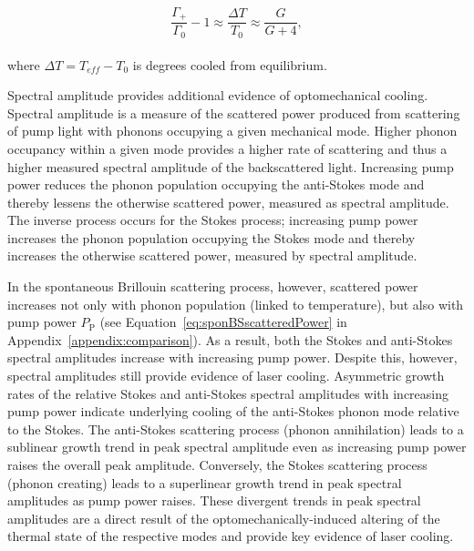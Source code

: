 \begin{equation}
  \frac{\Gamma_{+}}{\Gamma_{0}} - 1 \approx \frac{\Delta T}{T_{0}} \approx \frac{G}{G + 4},
  \label{eq:Cooliong:two methods of getting temperature}
\end{equation}
\\
where \(\Delta T = T_{eff} - T_{0}\) is degrees cooled from equilibrium.

Spectral amplitude provides additional evidence of optomechanical cooling. Spectral amplitude is a measure of the scattered power produced from scattering of pump light with phonons occupying a given mechanical mode. Higher phonon occupancy within a given mode provides a higher rate of scattering and thus a higher measured spectral amplitude of the backscattered light. Increasing pump power reduces the phonon population occupying the anti-Stokes mode and thereby lessens the otherwise scattered power, measured as spectral amplitude. The inverse process occurs for the Stokes process; increasing pump power increases the phonon population occupying the Stokes mode and thereby increases the otherwise scattered power, measured by spectral amplitude.

In the spontaneous Brillouin scattering process, however, scattered power increases not only with phonon population (linked to temperature), but also with pump power \(P_{\mathrm{P}}\) (see Equation~\ref{eq:sponBSscatteredPower} in Appendix~\ref{appendix:comparison}). As a result, both the Stokes and anti-Stokes spectral amplitudes increase with increasing pump power. Despite this, however, spectral amplitudes still provide evidence of laser cooling. Asymmetric growth rates of the relative Stokes and anti-Stokes spectral amplitudes with increasing pump power indicate underlying cooling of the anti-Stokes phonon mode relative to the Stokes. The anti-Stokes scattering process (phonon annihilation) leads to a sublinear growth trend in peak spectral amplitude even as increasing pump power raises the overall peak amplitude. Conversely, the Stokes scattering process (phonon creating) leads to a superlinear growth trend in peak spectral amplitudes as pump power raises. These divergent trends in peak spectral amplitudes are a direct result of the optomechanically-induced altering of the thermal state of the respective modes and provide key evidence of laser cooling.

